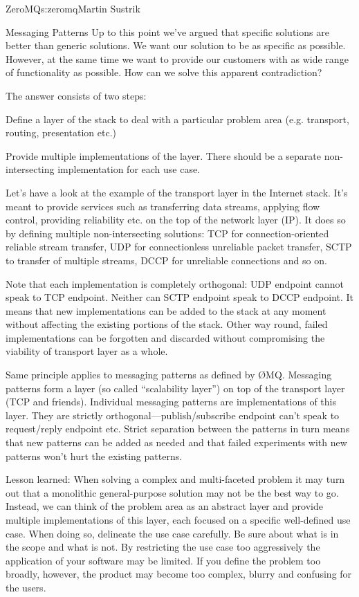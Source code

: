 \begin{aosachapter}{ZeroMQ}{s:zeromq}{Martin Sustrik}
\begin{aosasect1}{Messaging Patterns}
Up to this point we've argued that specific solutions are better than
generic solutions. We want our solution to be as specific as
possible. However, at the same time we want to provide our customers
with as wide range of functionality as possible. How can we solve this
apparent contradiction?

The answer consists of two steps:

\begin{aosaenumerate}

\item Define a layer of the stack to deal with a particular problem
  area (e.g. transport, routing, presentation etc.)

\item Provide multiple implementations of the layer. There should be a
  separate non-intersecting implementation for each use case.

\end{aosaenumerate}

Let's have a look at the example of the transport layer in the
Internet stack. It's meant to provide services such as transferring
data streams, applying flow control, providing reliability etc. on the
top of the network layer (IP). It does so by defining multiple
non-intersecting solutions: TCP for connection-oriented reliable
stream transfer, UDP for connectionless unreliable packet transfer,
SCTP to transfer of multiple streams, DCCP for unreliable connections
and so on.

Note that each implementation is completely orthogonal: UDP endpoint
cannot speak to TCP endpoint. Neither can SCTP endpoint speak to DCCP
endpoint. It means that new implementations can be added to the stack
at any moment without affecting the existing portions of the
stack. Other way round, failed implementations can be forgotten and
discarded without compromising the viability of transport layer as a
whole.

Same principle applies to messaging patterns as defined by
ØMQ. Messaging patterns form a layer (so called ``scalability layer'')
on top of the transport layer (TCP and friends). Individual messaging
patterns are implementations of this layer. They are strictly
orthogonal---publish/subscribe endpoint can't speak to request/reply
endpoint etc. Strict separation between the patterns in turn means
that new patterns can be added as needed and that failed experiments
with new patterns won't hurt the existing patterns.

Lesson learned: When solving a complex and multi-faceted problem it
may turn out that a monolithic general-purpose solution may not be the
best way to go. Instead, we can think of the problem area as an
abstract layer and provide multiple implementations of this layer,
each focused on a specific well-defined use case. When doing so,
delineate the use case carefully. Be sure about what is in the scope
and what is not. By restricting the use case too aggressively the
application of your software may be limited. If you define the problem
too broadly, however, the product may become too complex, blurry and
confusing for the users.


\end{aosasect1}
\end{aosachapter}
